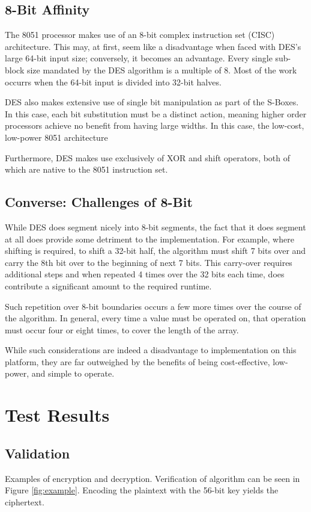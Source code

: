 \documentclass[conference]{IEEEtran}
\begin{document}
\subsection{8-Bit Affinity}
The 8051 processor makes use of an 8-bit complex instruction set (CISC) architecture. This may, at first, seem like a disadvantage when faced with DES's large 64-bit input size; conversely, it becomes an advantage. Every single sub-block size mandated by the DES algorithm is a multiple of 8. Most of the work occurrs when the 64-bit input is divided into 32-bit halves.

DES also makes extensive use of single bit manipulation as part of the S-Boxes. In this case, each bit substitution must be a distinct action, meaning higher order processors achieve no benefit from having large widths. In this case, the low-cost, low-power 8051 architecture 

Furthermore, DES makes use exclusively of XOR and shift operators, both of which are native to the 8051 instruction set.

\subsection{Converse: Challenges of 8-Bit}
While DES does segment nicely into 8-bit segments, the fact that it does segment at all does provide some detriment to the implementation. For example, where shifting is required, to shift a 32-bit half, the algorithm must shift 7 bits over and carry the 8th bit over to the beginning of next 7 bits. This carry-over requires additional steps and when repeated 4 times over the 32 bits each time, does contribute a significant amount to the required runtime. 

Such repetition over 8-bit boundaries occurs a few more times over the course of the algorithm. In general, every time a value must be operated on, that operation must occur four or eight times, to cover the length of the array.

While such considerations are indeed a disadvantage to implementation on this platform, they are far outweighed by the benefits of being cost-effective, low-power, and simple to operate.

\section{Test Results}
\subsection{Validation}
Examples of encryption and decryption. Verification of algorithm can be seen in Figure \ref{fig:example}. Encoding the plaintext with the 56-bit key yields the ciphertext.
\end{document}
